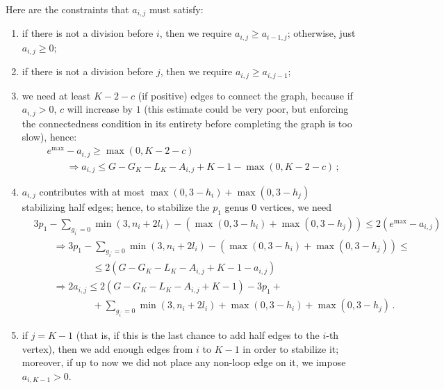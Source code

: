 \documentclass{amsart}
\theoremstyle{plain}
\theoremstyle{definition}
\DeclareMathOperator{\MAX}{max}
\begin{document}
Here are the constraints that $a_{i,j}$ must satisfy:
\begin{enumerate}
\item if there is not a division before $i$, then we require $a_{i,j} \geq
  a_{i-1,j}$; otherwise, just $a_{i,j} \geq 0$;
\item if there is not a division before $j$, then we require $a_{i,j}
  \geq a_{i,j-1}$;
\item we need at least $K-2-c$ (if positive) edges to connect the
  graph, because if $a_{i,j} > 0$, $c$ will increase by $1$ (this
  estimate could be very poor, but enforcing the connectedness
  condition in its entirety before completing the graph is too slow),
  hence:
  \begin{align*}
    &e^{\MAX} - a_{i,j} \geq \max(0, K-2-c)\\
    &\qquad\Rightarrow a_{i,j} \leq G - G_K - L_K - A_{i,j} +K - 1 - \max(0, K-2-c)\,\text{;}
  \end{align*}
\item $a_{i,j}$ contributes with at most $\max(0, 3-h_i) + \max(0,
  3-h_j)$ stabilizing half edges; hence, to stabilize the $p_1$ genus
  $0$ vertices, we need
  \begin{align*}
    &3p_1 - \sum_{g_{i^\prime} = 0} \min(3, n_i + 2l_i) - (\max(0, 3-h_i) + \max(0, 3-h_j)) \leq 2 (e^{\MAX} - a_{i,j})\\
    &\qquad\Rightarrow 3p_1 - \sum_{g_{i^\prime} = 0} \min(3, n_i + 2l_i) - (\max(0, 3-h_i) + \max(0, 3-h_j)) \leq \\
    &\qquad\qquad\qquad \leq 2 (G - G_K - L_K - A_{i,j} + K - 1 - a_{i,j})\\
    &\qquad\Rightarrow 2a_{i,j} \leq 2 (G - G_K - L_K - A_{i,j} + K - 1) - 3p_1 +\\
    &\qquad\qquad\qquad +\sum_{g_{i^\prime} = 0} \min(3, n_i + 2l_i) + \max(0, 3-h_i) + \max(0, 3-h_j)\,\text{.}
  \end{align*}
\item if $j = K-1$ (that is, if this is the last chance to add half
  edges to the $i$-th vertex), then we add enough edges from $i$ to
  $K-1$ in order to stabilize it; moreover, if up to now we did not
  place any non-loop edge on it, we impose $a_{i,K-1} > 0$.
\end{enumerate}

\end{document}
